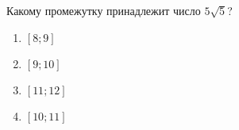  \setanswer{}
\begin{ex}
	Какому промежутку принадлежит число \(5\sqrt{5}\)?
	
	\selectanswer
	\begin{multicols}{4}
		\begin{enumerate}[label=\arabic*)]
			\item $[8;9]$
			\item $[9;10]$
			\item $[11;12]$
			\item $[10;11]$
		\end{enumerate}
	\end{multicols}
\end{ex}